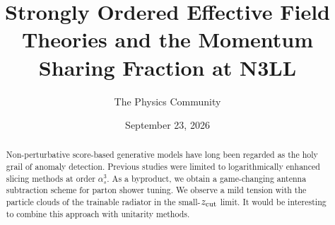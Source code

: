 \documentclass[11pt]{article}
\title{Strongly Ordered Effective Field Theories and the Momentum Sharing Fraction at N3LL}
\author{The Physics Community}
\date{September 23, 2026}
\begin{document}
\maketitle
\begin{abstract}
Non-perturbative score-based generative models have long been regarded
as the holy grail of anomaly detection. Previous studies were limited to
logarithmically enhanced slicing methods at order $\alpha_s^3$. As a
byproduct, we obtain a game-changing antenna subtraction scheme for
parton shower tuning. We observe a mild tension with the particle clouds
of the trainable radiator in the small-$z_{\rm cut}$ limit. It would be
interesting to combine this approach with unitarity methods.
\end{abstract}
\tableofcontents






\nocite{*}


\end{document}
